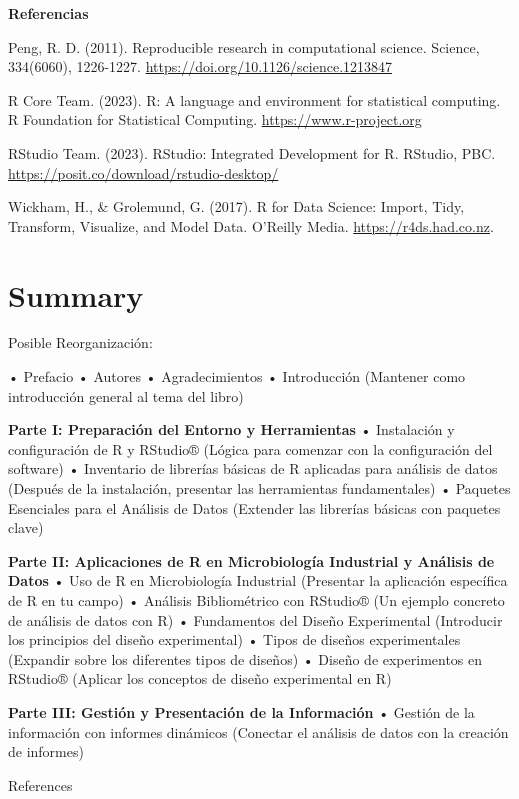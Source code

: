 \documentclass[
  letterpaper,
  DIV=11,
  numbers=noendperiod]{scrreprt}
\begin{document}
\textbf{Referencias}

Peng, R. D. (2011). Reproducible research in computational science.
Science, 334(6060), 1226-1227.
\url{https://doi.org/10.1126/science.1213847}

R Core Team. (2023). R: A language and environment for statistical
computing. R Foundation for Statistical Computing.
\url{https://www.r-project.org}

RStudio Team. (2023). RStudio: Integrated Development for R. RStudio,
PBC. \url{https://posit.co/download/rstudio-desktop/}

Wickham, H., \& Grolemund, G. (2017). R for Data Science: Import, Tidy,
Transform, Visualize, and Model Data. O'Reilly Media.
\href{https://r4ds.had.co.nz/}{https://r4ds.had.co.nz}.


\chapter{Summary}\label{summary}

Posible Reorganización:

• Prefacio • Autores • Agradecimientos • Introducción (Mantener como
introducción general al tema del libro)

\textbf{Parte I: Preparación del Entorno y Herramientas} • Instalación y
configuración de R y RStudio® (Lógica para comenzar con la configuración
del software) • Inventario de librerías básicas de R aplicadas para
análisis de datos (Después de la instalación, presentar las herramientas
fundamentales) • Paquetes Esenciales para el Análisis de Datos (Extender
las librerías básicas con paquetes clave)

\textbf{Parte II: Aplicaciones de R en Microbiología Industrial y
Análisis de Datos} • Uso de R en Microbiología Industrial (Presentar la
aplicación específica de R en tu campo) • Análisis Bibliométrico con
RStudio® (Un ejemplo concreto de análisis de datos con R) • Fundamentos
del Diseño Experimental (Introducir los principios del diseño
experimental) • Tipos de diseños experimentales (Expandir sobre los
diferentes tipos de diseños) • Diseño de experimentos en RStudio®
(Aplicar los conceptos de diseño experimental en R)

\textbf{Parte III: Gestión y Presentación de la Información} • Gestión
de la información con informes dinámicos (Conectar el análisis de datos
con la creación de informes)

References
\end{document}
